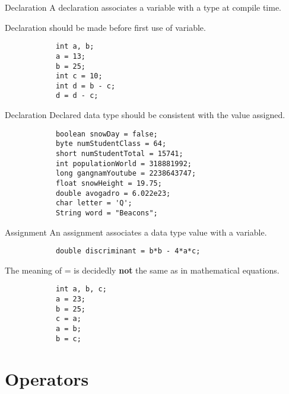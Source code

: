 \documentclass[10pt, compress]{beamer}
\begin{document}
\begin{slide}
	\begin{block}{Declaration}
		A declaration associates a variable with a type at compile time.

		Declaration should be made before first use of variable.
		\begin{verbatim}
			int a, b;
			a = 13;
			b = 25;
			int c = 10;
			int d = b - c;
			d = d - c;
		\end{verbatim}
	\end{block}
\end{slide}

\begin{slide}
	\begin{block}{Declaration}
		Declared data type should be consistent with the value assigned.
		\begin{verbatim}
			boolean snowDay = false;
			byte numStudentClass = 64;
			short numStudentTotal = 15741;
			int populationWorld = 318881992;
			long gangnamYoutube = 2238643747;
			float snowHeight = 19.75;
			double avogadro = 6.022e23;
			char letter = 'Q';
			String word = "Beacons";
		\end{verbatim}
	\end{block}
\end{slide}

\begin{slide}
	\begin{block}{Assignment}
		An assignment associates a data type value with a variable.
		\begin{verbatim}
			double discriminant = b*b - 4*a*c;
		\end{verbatim}
		The meaning of = is decidedly \textbf{not} the same as in mathematical equations.
		\begin{verbatim}
			int a, b, c;
			a = 23;
			b = 25;
			c = a;
			a = b;
			b = c;
		\end{verbatim}
	\end{block}
\end{slide}

\section{Operators}
\end{document}
